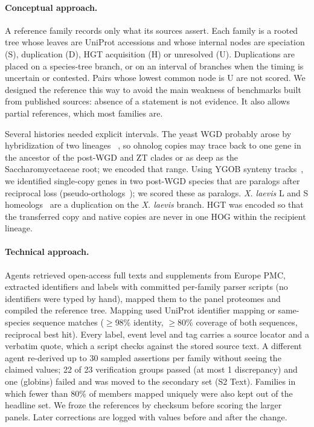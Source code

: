 \paragraph{Conceptual approach.} A reference family records only what its sources assert. Each family is a rooted
tree whose leaves are UniProt accessions and whose internal nodes are speciation (S), duplication (D), HGT acquisition
(H) or unresolved (U). Duplications are placed on a species-tree branch, or on an interval of branches when the
timing is uncertain or contested. Pairs whose lowest common node is U are not scored. We designed the reference this way
to avoid the main weakness of benchmarks built from published sources: absence of a statement is not evidence. It also allows partial references, which
most families are.

Several histories needed explicit intervals. The yeast WGD probably arose by hybridization of two lineages
~\cite{marcethouben2015}, so ohnolog copies may trace back to one gene in the ancestor of the post-WGD and ZT clades or
as deep as the Saccharomycetaceae root; we encoded that range. Using YGOB synteny tracks~\cite{byrne2005ygob}, we identified
single-copy genes in two post-WGD species that are paralogs after reciprocal loss (pseudo-orthologs~\cite{scannell2006}); we scored
these as paralogs. \textit{X. laevis} L and S homeologs~\cite{session2016xenopus} are a duplication on the
\textit{X. laevis} branch. HGT was encoded so that the transferred copy and native copies are never in one HOG within
the recipient lineage.

\paragraph{Technical approach.} Agents retrieved open-access full texts and supplements from Europe PMC, extracted
identifiers and labels with committed per-family parser scripts (no identifiers were typed by hand), mapped them to
the panel proteomes and compiled the reference tree. Mapping used UniProt identifier mapping or same-species sequence
matches ($\geq$98\% identity, $\geq$80\% coverage of both sequences, reciprocal best hit). Every label, event level
and tag carries a source locator and a verbatim quote, which a script checks against the stored source text. A
different agent re-derived up to 30 sampled assertions per family without seeing the claimed values; 22 of 23
verification groups passed (at most 1 discrepancy) and one (globins) failed and was moved to the secondary set
(S2 Text). Families in which fewer than 80\% of members mapped uniquely were also kept out of the headline set. We froze the
references by checksum before scoring the larger panels. Later corrections are logged with values before and after
the change.

